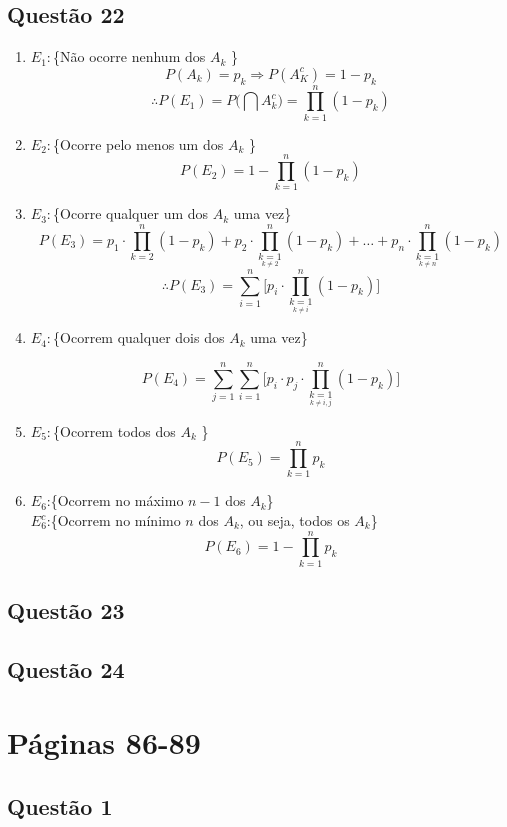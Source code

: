 \documentclass[a4paper,12pt]{report}
\begin{document}
\section{Questão 22}
\begin{enumerate}[label=\alph*)]
	\item 
	$E_1:$\{Não ocorre nenhum dos $A_k$ \} 
	$$P(A_k)=p_k \Rightarrow P(A_K^c) = 1-p_k $$
	$$\therefore  P(E_1)=P\bigg(\bigcap A_k^c \bigg)= \prod\limits_{k=1}^n(1-p_k)$$
	\item 	$E_2:$\{Ocorre pelo menos  um dos $A_k$ \} 
	$$P(E_2) =1- \prod\limits_{k=1}^n(1-p_k)  $$
	\item $E_3:$\{Ocorre qualquer um dos $A_k$ uma vez\}
	$$P(E_3) = p_1\cdot \prod\limits_{k=2}^n(1-p_k)+p_2\cdot \prod\limits_{\underset{k\ne 2}{k=1}}^n(1-p_k)+\ldots + 
	 p_n\cdot\prod\limits_{\underset{k\ne n}{k=1}}^n(1-p_k)
	 $$ 
	 $$
	 \therefore  P(E_3) = \sum\limits_{i=1}^{n}\bigg[p_i \cdot\prod\limits_{\underset{k\ne i}{k=1}}^n(1-p_k)    \bigg]
	 $$
	 \item $E_4:$\{Ocorrem qualquer dois dos $A_k$ uma vez\}
	 
	 $$P(E_4) =  \sum\limits_{j=1}^{n}\sum\limits_{i=1}^{n}\bigg[p_i\cdot p_j \cdot\prod\limits_{\underset{k\ne {i,j}}{k=1}}^n(1-p_k)    \bigg] $$
	 \item 
	 	$E_5:$\{Ocorrem todos dos $A_k$ \} 
	 $$P(E_5) =\prod\limits_{k=1}^n p_k $$
	 \item $E_6$:\{Ocorrem no máximo $n-1$ dos $A_k$\}\\
	 $E_6^c$:\{Ocorrem no mínimo $n$ dos $A_k$, ou seja, todos os $A_k$\}
	  $$P(E_6) =1-\prod\limits_{k=1}^n p_k $$
\end{enumerate}

\newpage
\section{Questão 23}

\newpage


\section{Questão 24}
\newpage

\chapter{Páginas 86-89}

\section{Questão 1}
\end{document}
